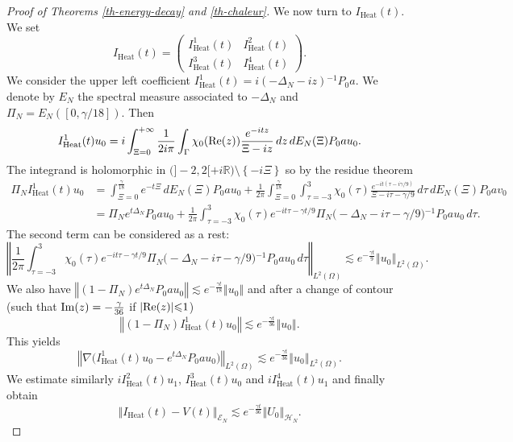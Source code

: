 \documentclass[10pt, a4paper,reqno]{amsart}
\theoremstyle{plain}
\theoremstyle{definition}
\theoremstyle{remark}
\begin{document}
\begin{proof}[Proof of Theorems \ref{th-energy-decay} and \ref{th-chaleur}]
{\noindent {\bf $\bullet$}\quad } We now turn to $I_{\textrm{Heat}}(t)$. We set
\[
I_{\textrm{Heat}}(t) = 
\begin{pmatrix}
I_{\textrm{Heat}}^1 (t) & I_{\textrm{Heat}}^2 (t) \\
I_{\textrm{Heat}}^3 (t) & I_{\textrm{Heat}}^4 (t)
\end{pmatrix}.
\]
We consider the upper left coefficient $I_{\textrm{Heat}}^1 (t) = i{{(-{{\Delta}_N} -iz){^{-1}}}} P_0 a$. We denote by $E_N$ the spectral measure associated to $-{{\Delta}_N} $ and $\Pi_N = E_N([0,{\gamma}/18])$. Then 
\begin{align*}
I_{\textrm{Heat}}^1(t) u_0 =  i \int_{\Xi = 0}^{+\infty} \frac {1}{2i\pi} \int_{\Gamma} {\chi}_0({\mathop{\rm{Re}}\nolimits}(z)) \frac {e^{-itz}} {\Xi - i z}  \, dz \, dE_N(\Xi) P_0 a u_0.
\end{align*}
The integrand is holomorphic in $\big(]-2,2[ + i{\mathbb{R}}\big) \setminus {\left\{ {-i\Xi} \right\}}$ so by the residue theorem
\begin{align*}
\Pi_N I_{\textrm{Heat}}^1(t) u_0
& = \int_{\Xi = 0}^{\frac {\gamma} {18}}   e^{-t\Xi}   \, dE_N(\Xi)P_0 a u_0  +  \frac {1}{2\pi} \int_{\Xi = 0}^{\frac {\gamma} {18}} \int_{{\tau} = -3}^3 {\chi}_0({\tau}) \frac {e^{-it({\tau}-i{\gamma}/9)}} {\Xi - i {\tau} - {\gamma} /9}\, d{\tau} \, dE_N(\Xi) P_0 a v_0  \\
& = \Pi_N e^{t{{\Delta}_N}}  P_0 a u_0 +  \frac {1}{2\pi} \int_{{\tau} = -3}^3 {\chi}_0({\tau}) e^{-it{\tau}- {\gamma} t/9} \Pi_N \big(-{{\Delta}_N}  - i {\tau} - {\gamma}/9\big){^{-1}} P_0 a u_0 \, d{\tau}.
\end{align*}
The second term can be considered as a rest:
\[
{\left\Vert {\frac {1}{2\pi} \int_{{\tau} = -3}^3 {\chi}_0({\tau}) e^{-it{\tau}- {\gamma} t/9} \Pi_N \big(-{{\Delta}_N}  - i {\tau} - {\gamma}/9\big){^{-1}} P_0 a u_0 \, d{\tau}}\right\Vert}_{L^2({\Omega})} \lesssim e^{-\frac {{\gamma} t} 9} {\left\Vert {u_0}\right\Vert}_{L^2({\Omega})}.
\]
We also have ${\left\Vert {(1-\Pi_N) e^{t{{\Delta}_N}} P_0 a u_0}\right\Vert} \lesssim e^{- \frac {{\gamma} t} {18}} {\left\Vert {u_0}\right\Vert}$ and after a change of contour (such that ${\mathop{\rm{Im}}\nolimits}(z) = - \frac {\gamma}{36}$ if ${\left\vert {{\mathop{\rm{Re}}\nolimits}(z)}\right\vert} {\leqslant} 1$)
\[
{\left\Vert {(1-\Pi_N) I_{\textrm{Heat}}^1(t) u_0}\right\Vert} \lesssim e^{-\frac {{\gamma} t}{36}} {\left\Vert {u_0}\right\Vert}.
\]
This yields
\[
{\left\Vert {\nabla  \big( I_{\textrm{Heat}}^{1}(t)u_0 - e^{t{{\Delta}_N} } P_0 a u_0\big)}\right\Vert}_{L^2({\Omega})} \lesssim e^{-\frac {{\gamma} t} {36}} {\left\Vert {u_0}\right\Vert}_{L^2({\Omega})}.
\]
We estimate similarly $iI_{\textrm{Heat}}^2(t) u_1$, $I_{\textrm{Heat}}^3(t) u_0$ and $i I_{\textrm{Heat}}^4(t)u_1$ and finally obtain 
\begin{equation} \label{estim-Iheat}
{\left\Vert {I_{\textrm{Heat}}(t) - V(t)}\right\Vert}_{\mathscr E_N} \lesssim  e^{-\frac {{\gamma} t}{36}} {\left\Vert {U_0}\right\Vert}_{\mathcal H_N}.
\end{equation}


\end{proof}
\end{document}
